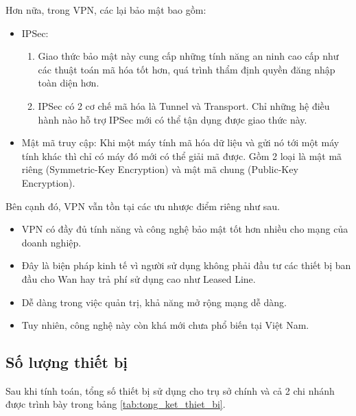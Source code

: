 \documentclass[a4paper]{article}
\begin{document}
Hơn nữa, trong VPN, các lại bảo mật bao gồm:
    \begin{itemize}
        \item IPSec:
        \begin{enumerate}
            \item Giao thức bảo mật này cung cấp những tính năng an ninh cao cấp như các thuật toán mã hóa tốt hơn, quá trình thẩm định quyền đăng nhập toàn diện hơn.
            \item IPSec có 2 cơ chế mã hóa là Tunnel và Transport. Chỉ những hệ điều hành nào hỗ trợ IPSec mới có thể tận dụng được giao thức này.
        \end{enumerate}
        \item Mật mã truy cập: Khi một máy tính mã hóa dữ liệu và gửi nó tới một máy tính khác thì chỉ có máy đó mới có thể giải mã được. Gồm 2 loại là mật mã riêng (Symmetric-Key Encryption) và mật mã chung (Public-Key Encryption).
    \end{itemize}

Bên cạnh đó, VPN vẫn tồn tại các ưu nhược điểm riêng như sau.
    \begin{itemize}
        \item VPN có đầy đủ tính năng và công nghệ bảo mật tốt hơn nhiều cho mạng của doanh nghiệp.
        \item Đây là biện pháp kinh tế vì người sử dụng không phải đầu tư các thiết bị ban đầu cho Wan hay trả phí sử dụng cao như Leased Line.
        \item Dễ dàng trong việc quản trị, khả năng mở rộng mạng dễ dàng.
        \item Tuy nhiên, công nghệ này còn khá mới chưa phổ biến tại Việt Nam.
    \end{itemize}

\subsection{Số lượng thiết bị}
Sau khi tính toán, tổng số thiết bị sử dụng cho trụ sở chính và cả 2 chi nhánh được trình bày trong bảng \ref{tab:tong_ket_thiet_bi}.
\end{document}
